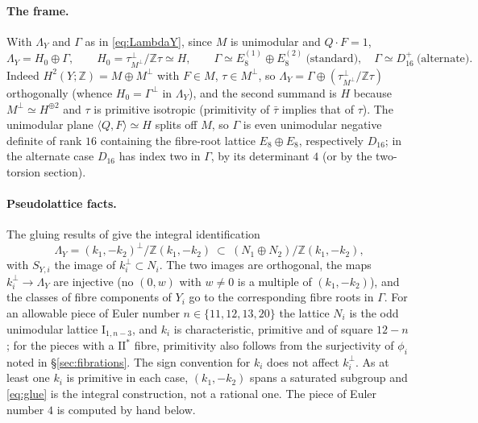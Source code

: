 \documentclass[11pt]{article}
\newcommand{\Z}{\mathbb Z}
\newcommand{\II}{\mathrm{II}}
\newcommand{\I}{\mathrm{I}}
\theoremstyle{definition}
\theoremstyle{remark}
\begin{document}
\paragraph{The frame.}
With \(\Lambda_Y\) and \(\Gamma\) as in \eqref{eq:LambdaY}, since
\(M\) is unimodular and \(Q\cdot F=1\),
\begin{equation}\label{eq:frame}
 \Lambda_Y=H_0\oplus\Gamma,\qquad H_0=\tau^\perp_{M^\perp}/\Z\tau\simeq H,
 \qquad
 \Gamma\simeq E_8^{(1)}\oplus E_8^{(2)}\ \text{(standard)},\quad
 \Gamma\simeq D_{16}^{+}\ \text{(alternate)}.
\end{equation}
Indeed
\(H^2(Y;\Z)=M\oplus M^\perp\) with \(F\in M\), \(\tau\in M^\perp\), so
\(\Lambda_Y=\Gamma\oplus(\tau^\perp_{M^\perp}/\Z\tau)\) orthogonally
(whence \(H_0=\Gamma^\perp\) in \(\Lambda_Y\)), and the second
summand is \(H\) because \(M^\perp\simeq H^{\oplus2}\) and \(\tau\) is
primitive isotropic (primitivity of \(\bar\tau\) implies that of
\(\tau\)). The unimodular plane \(\langle Q,F\rangle\simeq H\) splits
off \(M\), so \(\Gamma\) is even unimodular negative definite of rank
\(16\) containing the fibre-root lattice \(E_8\oplus E_8\), respectively
\(D_{16}\); in the alternate case \(D_{16}\) has index two in
\(\Gamma\), by its determinant \(4\) (or by the two-torsion section).

\paragraph{Pseudolattice facts.}
The gluing results of \cite[Propositions~4.18 and~4.20]{GT}
give the integral identification
\begin{equation}\label{eq:glue}
 \Lambda_Y=(k_1,-k_2)^\perp/\Z(k_1,-k_2)
 \ \subset\ (N_1\oplus N_2)/\Z(k_1,-k_2),
\end{equation}
with \(S_{Y,i}\) the image of \(k_i^\perp\subset N_i\). The two
images are orthogonal, the maps \(k_i^\perp\to\Lambda_Y\) are
injective (no \((0,w)\) with \(w\neq0\) is a multiple of
\((k_1,-k_2)\)), and the classes of fibre components of \(Y_i\) go to
the corresponding fibre roots in \(\Gamma\). For an allowable piece of
Euler number \(n\in\{11,12,13,20\}\) the lattice \(N_i\) is the odd
unimodular lattice \(\I_{1,n-3}\), and \(k_i\) is characteristic,
primitive and of square \(12-n\)
\cite[Theorems~2.18 and~4.10, Lemma~2.20]{GT}; for the pieces with a
\(\II^*\) fibre, primitivity also follows from the surjectivity of
\(\phi_i\) noted in \S\ref{sec:fibrations}. The sign convention for
\(k_i\) does not affect \(k_i^\perp\). As at least one \(k_i\) is
primitive in each case, \((k_1,-k_2)\) spans a saturated subgroup and
\eqref{eq:glue} is the integral construction, not a rational one. The
piece of Euler number \(4\) is computed by hand below.
\end{document}
